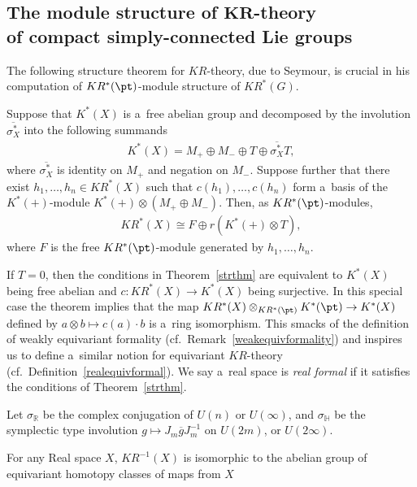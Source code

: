 \subsection[The module structure of $KR$-theory of compact simply-connected Lie groups]{The
module structure of $\boldsymbol{KR}$-theory\\ of compact simply-connected Lie groups}
The following structure theorem for $KR$-theory, due to Seymour, is crucial in his computation of
$KR^*(\pt)$-module structure of $KR^*(G)$.
\begin{Theorem}[{\cite[Theorem 4.2]{Se}}]\label{strthm}
Suppose that $K^*(X)$ is a~free abelian group and decomposed by the involution $\overline{\sigma_X^*}$ into the following summands
\begin{gather*}
K^*(X)=M_+\oplus M_-\oplus T\oplus \overline{\sigma_X^*}T,
\end{gather*}
where $\overline{\sigma_X^*}$ is identity on $M_+$ and negation on $M_-$.
Suppose further that there exist $h_1, \dots, h_n\in KR^*(X)$ such that $c(h_1), \dots, c(h_n)$ form a~basis of the
$K^*(+)$-module $K^*(+)\otimes(M_+\oplus M_-)$.
Then, as $KR^*(\pt)$-modules,
\begin{gather*}
KR^*(X)\cong F\oplus r(K^*(+)\otimes T),
\end{gather*}
where $F$ is the free $KR^*(\pt)$-module generated by $h_1, \dots, h_n$.
\end{Theorem}
\begin{Remark}
If $T=0$, then the conditions in Theorem~\ref{strthm} are equivalent to $K^*(X)$ being free abelian and $c: KR^*(X)\to
K^*(X)$ being surjective.
In this special case the theorem
implies that the map $KR^*(X)\otimes_{KR^*(\pt)}K^*(\pt)\to K^*(X)$ def\/ined
by $a\otimes b\mapsto c(a)\cdot b$ is a~ring isomorphism.
This smacks of the def\/inition of weakly equivariant formality (cf.\ Remark~\ref{weakequivformality}) and inspires us to
def\/ine a~similar notion for equivariant $KR$-theory (cf.\ Def\/inition~\ref{realequivformal}).
We say a~real space is \emph{real formal} if it satisf\/ies the conditions of Theorem~\ref{strthm}.
\end{Remark}
\begin{Definition}
Let $\sigma_\mathbb{R}$ be the complex conjugation of $U(n)$ or $U(\infty)$,
and $\sigma_\mathbb{H}$ be the symplectic type involution $g\mapsto J_m\overline{g}J_m^{-1}$ on $U(2m)$, or $U(2\infty)$.
\end{Definition}
For any Real space $X$, $KR^{-1}(X)$ is isomorphic to the abelian group of equivariant homotopy classes of maps from $X$
